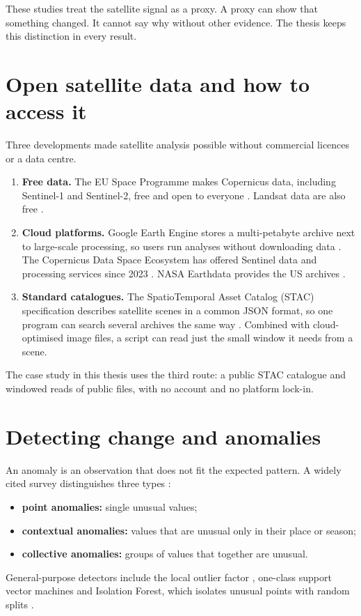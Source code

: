 These studies treat the satellite signal as a proxy. A proxy can show that something changed. It cannot say why without other evidence. The thesis keeps this distinction in every result.

\section{Open satellite data and how to access it}

Three developments made satellite analysis possible without commercial licences or a data centre.

\begin{enumerate}
  \item \textbf{Free data.} The EU Space Programme makes Copernicus data, including Sentinel-1 and Sentinel-2, free and open to everyone \cite{R256}. Landsat data are also free \cite{R238}.
  \item \textbf{Cloud platforms.} Google Earth Engine stores a multi-petabyte archive next to large-scale processing, so users run analyses without downloading data \cite{R207}. The Copernicus Data Space Ecosystem has offered Sentinel data and processing services since 2023 \cite{R202}. NASA Earthdata provides the US archives \cite{R205}.
  \item \textbf{Standard catalogues.} The SpatioTemporal Asset Catalog (STAC) specification describes satellite scenes in a common JSON format, so one program can search several archives the same way \cite{R250}. Combined with cloud-optimised image files, a script can read just the small window it needs from a scene.

\end{enumerate}
The case study in this thesis uses the third route: a public STAC catalogue and windowed reads of public files, with no account and no platform lock-in.

\section{Detecting change and anomalies}

An anomaly is an observation that does not fit the expected pattern. A widely cited survey distinguishes three types \cite{R239}:

\begin{itemize}
  \item \textbf{point anomalies:} single unusual values;
  \item \textbf{contextual anomalies:} values that are unusual only in their place or season;
  \item \textbf{collective anomalies:} groups of values that together are unusual.

\end{itemize}
General-purpose detectors include the local outlier factor \cite{R244}, one-class support vector machines \cite{R246} and Isolation Forest, which isolates unusual points with random splits \cite{R206, R247}.

